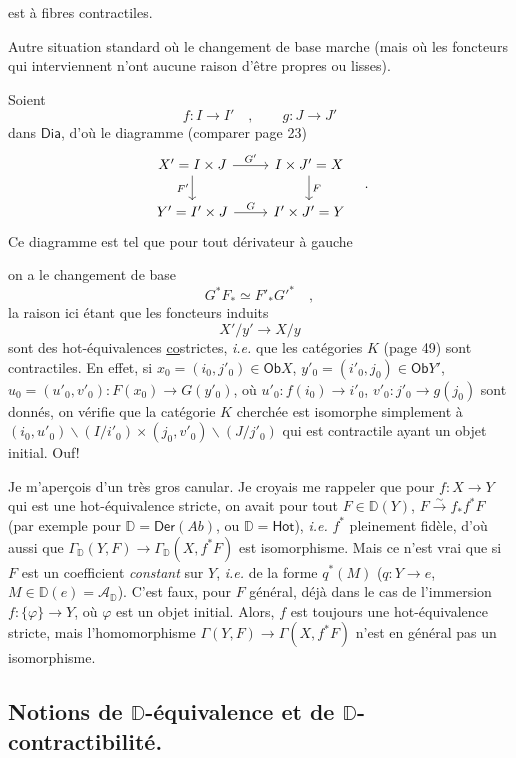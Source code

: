 \documentclass[11pt,leqno]{article}
\newcommand{\printedpage}[1]{\marginpar{\footnotesize p.~#1}}
\newcommand{\msp}[1]{\marginpar{\footnotesize [#1]}}
\newcommand{\DD}{\mathbb{D}}
\newcommand{\cA}{\mathcal{A}}
\newcommand{\Dia}{\mathsf{Dia}}
\newcommand{\Ob}{\mathsf{Ob}}
\newcommand{\Hot}{\mathsf{Hot}}
\newcommand{\isoto}{\overset{\sim}{\to}}
\begin{document}
\printedpage{34}
\noindent est à fibres contractiles.

Autre situation standard où le changement de base marche (mais où les foncteurs qui interviennent n'ont aucune raison d'être propres ou lisses).

Soient
\[
f : I \longrightarrow I' \quad , \qquad g : J \longrightarrow J'
\]
dans $\Dia$, d'où le diagramme (comparer page 23)
\[
\begin{tikzcd}
X' = I \times J \arrow[r, "G'"] \arrow[d, "F'"'] & I \times J' = X \arrow[d, "F"] \\
Y' = I' \times J \arrow[r, "G"] & I' \times J' = Y
\end{tikzcd}
\quad .
\]
Ce diagramme est tel que pour tout dérivateur à gauche

\noindent\msp{page 60}

\noindent on a le changement de base
\[
G^*F_* \simeq F'_*{G'}^* \quad ,
\]
la raison ici étant que les foncteurs induits
\[
X'/y' \longrightarrow X/y
\]
sont des hot-équivalences \underline{\underline{co}}strictes, \textit{i.e.} que les catégories $K$ (page 49) sont contractiles. En effet, si $x_0 = (i_0, j'_0) \in \Ob X$, $y'_0 = (i'_0, j_0) \in \Ob Y'$, $u_0 = (u'_0, v'_0) : F(x_0) \to G(y'_0)$, où $u'_0 : f(i_0) \to i'_0$, $v'_0 : j'_0 \to g(j_0)$ sont donnés, on vérifie que la catégorie $K$ cherchée est isomorphe simplement à $(i_0, u'_0)\backslash(I/i'_0) \times (j_0, v'_0)\backslash(J/j'_0)$ qui est contractile ayant un objet initial. Ouf!

Je m'aperçois d'un très gros canular. Je croyais me rappeler que pour $f : X \to Y$ qui est une hot-équivalence stricte, on avait pour tout $F \in \DD(Y)$, $F \isoto f_*f^*F$ (par exemple pour $\DD = \mathsf{Der}(\mathit{Ab})$, ou $\DD = \Hot$), \textit{i.e.} $f^*$ pleinement fidèle, d'où aussi que $\Gamma_{\DD}(Y, F) \to \Gamma_{\DD}(X, f^*F)$ est isomorphisme. Mais ce n'est vrai que si $F$ est un coefficient \textit{constant} sur $Y$, \textit{i.e.} de la forme $q^*(M)$ ($q : Y \to e$, $M \in \DD(e) = \cA_{\DD}$). C'est faux, pour $F$ général, déjà dans le cas de l'immersion $f : \{\varphi\} \to Y$, où $\varphi$ est un objet initial. Alors, $f$ est toujours une hot-équivalence stricte, mais l'homomorphisme $\Gamma(Y, F) \to \Gamma(X, f^*F)$ n'est en général pas un isomorphisme.

\clearpage
\printedpage{35}
\noindent\msp{page 61}

\subsection*{Notions de $\mathbb{D}$-équivalence et de $\mathbb{D}$-contractibilité.}
\end{document}
